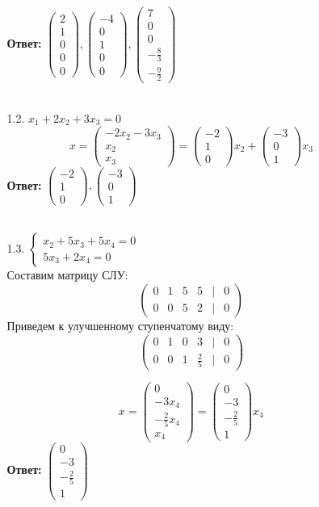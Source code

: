 \documentclass[a4paper]{article}
\newcommand{\mat}[1]{\begin{pmatrix} #1 \end{pmatrix}}
\renewcommand{\f}[2]{\frac{#1}{#2}}
\newcommand{\case}[1]{\begin{cases} #1 \end{cases}}
\begin{document}
\begin{enumerate}
\begin{enumerate}
        \textbf{Ответ: }$\mat{2 \\ 1 \\ 0\\0\\ 0},\mat{-4 \\ 0 \\ 1\\0 \\ 0},\mat{7 \\ 0\\ 0\\-\f{8}{3} \\ -\f{9}{2}}$\\\\

        \item[1.2.]$
        x_{1}+2 x_{2}+3 x_{3}=0
        $\\
        $$x= \mat{-2x_{2}-3x_{3}\\x_2\\x_3} = \mat{-2\\1\\0}x_2 + \mat{-3\\0\\1}x_3$$
        \textbf{Ответ: }$\mat{-2\\1\\0}, \mat{-3\\0\\1}$\\\\

        \item[1.3.]$\case{
            x_{2}+5 x_{3}+5 x_{4}  =0  \\
            5 x_{3}+2 x_{4}  =0 
            }$\\
        Составим матрицу СЛУ:
        $$
        \begin{pmatrix}
        0 & 1 & 5 & 5 &| & 0 \\
        0 & 0 & 5 & 2 & | &0
        \end{pmatrix}
        $$
        Приведем к улучшенному ступенчатому виду:
        $$
        \begin{pmatrix}
        0 & 1 & 0 & 3 & | & 0 \\
        0 & 0 & 1 & \frac{2}{5} & | & 0
        \end{pmatrix}
        $$

        $$x = \mat{0 \\ -3x_4 \\ -\f{2}{5}x_4 \\ x_4} = \mat{0 \\ -3 \\ -\f{2}{5} \\ 1}x_4$$
        \textbf{Ответ: }$\mat{0 \\ -3 \\ -\f{2}{5} \\ 1}$\\



\end{enumerate}
\end{enumerate}
\end{document}
